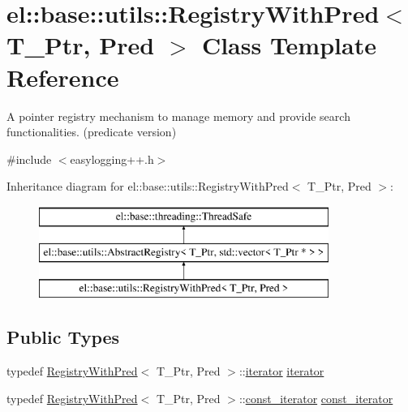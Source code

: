 \hypertarget{classel_1_1base_1_1utils_1_1_registry_with_pred}{}\section{el\+:\+:base\+:\+:utils\+:\+:Registry\+With\+Pred$<$ T\+\_\+\+Ptr, Pred $>$ Class Template Reference}
\label{classel_1_1base_1_1utils_1_1_registry_with_pred}


A pointer registry mechanism to manage memory and provide search functionalities. (predicate version)  




{\ttfamily \#include $<$easylogging++.\+h$>$}

Inheritance diagram for el\+:\+:base\+:\+:utils\+:\+:Registry\+With\+Pred$<$ T\+\_\+\+Ptr, Pred $>$\+:\begin{figure}[H]
\begin{center}
\leavevmode
\includegraphics[height=3.000000cm]{classel_1_1base_1_1utils_1_1_registry_with_pred}
\end{center}
\end{figure}
\subsection*{Public Types}
\begin{DoxyCompactItemize}
\item 
typedef \hyperlink{classel_1_1base_1_1utils_1_1_registry_with_pred}{Registry\+With\+Pred}$<$ T\+\_\+\+Ptr, Pred $>$\+::\hyperlink{classel_1_1base_1_1utils_1_1_registry_with_pred_afc03d2d0a72f5ebf03e1e3b37bd9932d}{iterator} \hyperlink{classel_1_1base_1_1utils_1_1_registry_with_pred_afc03d2d0a72f5ebf03e1e3b37bd9932d}{iterator}
\item 
typedef \hyperlink{classel_1_1base_1_1utils_1_1_registry_with_pred}{Registry\+With\+Pred}$<$ T\+\_\+\+Ptr, Pred $>$\+::\hyperlink{classel_1_1base_1_1utils_1_1_registry_with_pred_ad9af7a8eeedd58a75eb70bccb334f6dc}{const\+\_\+iterator} \hyperlink{classel_1_1base_1_1utils_1_1_registry_with_pred_ad9af7a8eeedd58a75eb70bccb334f6dc}{const\+\_\+iterator}
\end{DoxyCompactItemize}
